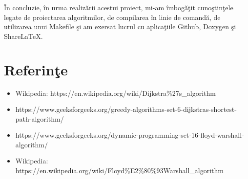 \documentclass{article}
\begin{document}
\clearpage
\^{I}n concluzie, \^{i}n urma realiz\u{a}rii acestui proiect, mi-am \^{i}mbog\u{a}\c{t}it cuno\c{s}tin\c{t}ele legate de proiectarea algoritmilor, de compilarea \^{i}n linie de comand\u{a}, de utilizarea unui Makefile \c{s}i am exersat lucrul cu aplica\c{t}iile Github, Doxygen \c{s}i ShareLaTeX.
\section{Referin\c{t}e}
\begin{itemize}
\item Wikipedia: https://en.wikipedia.org/wiki/Dijkstra\%27s\_algorithm
\item https://www.geeksforgeeks.org/greedy-algorithms-set-6-dijkstras-shortest-path-algorithm/
\item https://www.geeksforgeeks.org/dynamic-programming-set-16-floyd-warshall-algorithm/
\item Wikipedia: https://en.wikipedia.org/wiki/Floyd\%E2\%80\%93Warshall\_algorithm

\end{itemize}
\end{document}

